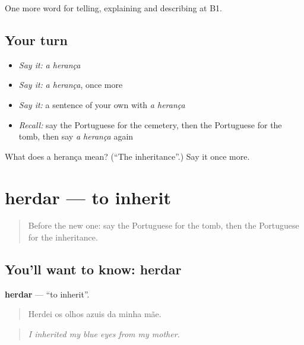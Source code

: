 \begin{grammarlens}[title={What you've built}]
One more word for telling, explaining and describing at B1.
\end{grammarlens}

\subsection*{Your turn}
\begin{itemize}
\raggedright
  \item \emph{Say it:} \emph{a herança}
  \item \emph{Say it:} \emph{a herança}, once more
  \item \emph{Say it:} a sentence of your own with \emph{a herança}
  \item \emph{Recall:} say the Portuguese for the cemetery, then the Portuguese for the tomb, then say \emph{a herança} again
\end{itemize}

\begin{tcolorbox}[breakable,colback=teal!4,colframe=teal!35!black,title={Before you move on}]
What does a herança mean? (\textquotedblleft{}The inheritance\textquotedblright{}.) Say it once more.
\end{tcolorbox}
\section[herdar]{herdar — to inherit}

\label{lesson:PT-C316-herdar}



\begin{quote}
Before the new one: say the Portuguese for the tomb, then the Portuguese for the inheritance.
\end{quote}

\subsection*{You'll want to know: herdar}
\textbf{herdar} — \textquotedblleft{}to inherit\textquotedblright{}.

\begin{quote}
Herdei os olhos azuis da minha mãe.
\end{quote}

\begin{quote}
\emph{I inherited my blue eyes from my mother.}
\end{quote}

